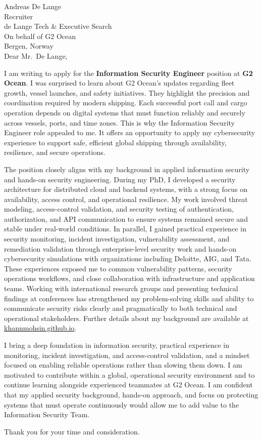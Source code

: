 Andreas De Lange\\
Recruiter\\
de Lange Tech \& Executive Search\\
On behalf of G2 Ocean\\
Bergen, Norway\\

Dear Mr.\ De Lange,

I am writing to apply for the \textbf{Information Security Engineer} position at \textbf{G2 Ocean}. 
%
I was surprised to learn about G2 Ocean’s updates regarding fleet growth, vessel launches, and safety initiatives. They highlight the precision and coordination required by modern shipping. Each successful port call and cargo operation depends on digital systems that must function reliably and securely across vessels, ports, and time zones. This is why the Information Security Engineer role appealed to me. It offers an opportunity to apply my cybersecurity experience to support safe, efficient global shipping through availability, resilience, and secure operations.

The position closely aligns with my background in applied information security and hands-on security engineering. During my PhD, I developed a security architecture for distributed cloud and backend systems, with a strong focus on availability, access control, and operational resilience. My work involved threat modeling, access-control validation, and security testing of authentication, authorization, and API communication to ensure systems remained secure and stable under real-world conditions. In parallel, I gained practical experience in security monitoring, incident investigation, vulnerability assessment, and remediation validation through enterprise-level security work and hands-on cybersecurity simulations with organizations including Deloitte, AIG, and Tata. These experiences exposed me to common vulnerability patterns, security operations workflows, and close collaboration with infrastructure and application teams. Working with international research groups and presenting technical findings at conferences has strengthened my problem-solving skills and ability to communicate security risks clearly and pragmatically to both technical and operational stakeholders. Further details about my background are available at \href{https://khannmohsin.github.io}{\underline{khannmohsin.github.io}}.

I bring a deep foundation in information security, practical experience in monitoring, incident investigation, and access-control validation, and a mindset focused on enabling reliable operations rather than slowing them down. I am motivated to contribute within a global, operational security environment and to continue learning alongside experienced teammates at G2 Ocean. I am confident that my applied security background, hands-on approach, and focus on protecting systems that must operate continuously would allow me to add value to the Information Security Team.

Thank you for your time and consideration.
